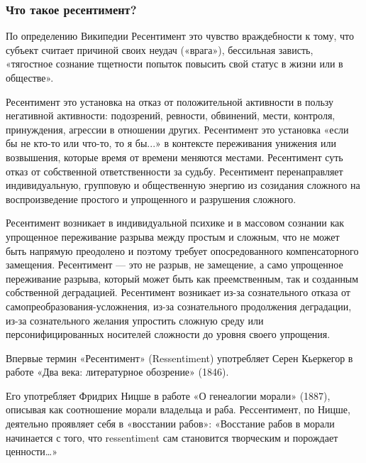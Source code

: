  
 
 
 
 

\subsubsection{Что такое ресентимент?}

По определению Википедии Ресентимент это чувство враждебности к тому, что
субъект считает причиной своих неудач («врага»), бессильная зависть, «тягостное
сознание тщетности попыток повысить свой статус в жизни или в обществе».

Ресентимент это установка на отказ от положительной активности в пользу
негативной активности: подозрений, ревности, обвинений, мести, контроля,
принуждения, агрессии в отношении других. Ресентимент это установка «если бы не
кто-то или что-то, то я бы...» в контексте переживания унижения или возвышения,
которые время от времени меняются местами. Ресентимент суть отказ от
собственной ответственности за судьбу. Ресентимент перенаправляет
индивидуальную, групповую и общественную энергию из созидания сложного на
воспроизведение простого и упрощенного и разрушения сложного.

Ресентимент возникает в индивидуальной психике и в массовом сознании как
упрощенное переживание разрыва между простым и сложным, что не может быть
напрямую преодолено и поэтому требует опосредованного компенсаторного
замещения. Ресентимент — это не разрыв, не замещение, а само упрощенное
переживание разрыва, который может быть как преемственным, так и созданным
собственной деградацией. Ресентимент возникает из-за сознательного отказа от
самопреобразования-усложнения, из-за сознательного продолжения деградации,
из-за сознательного желания упростить сложную среду или персонифицированных
носителей сложности до уровня своего упрощения.

Впервые термин «Ресентимент» (Ressentiment) употребляет Серен Кьеркегор в
работе «Два века: литературное обозрение» (1846).

Его употребляет Фридрих Ницше в работе «О генеалогии морали» (1887), описывая
как соотношение морали владельца и раба. Рессентимент, по Ницше, деятельно
проявляет себя в «восстании рабов»: «Восстание рабов в морали начинается с
того, что ressentiment сам становится творческим и порождает ценности…»

